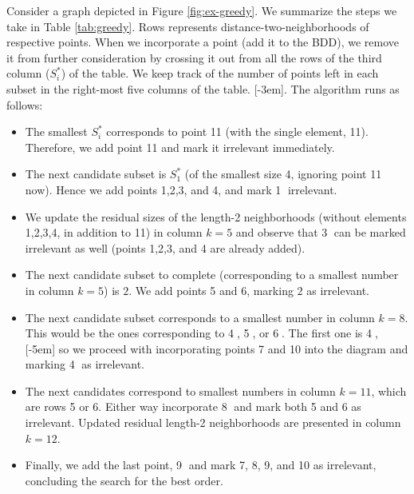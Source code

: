 \documentclass[11pt]{article}
\begin{document}
\begin{example}\label{ex:greedy}
Consider a graph depicted in Figure \ref{fig:ex-greedy}. We summarize the steps we
take in Table \ref{tab:greedy}. Rows represents distance-two-neighborhoods of
respective points. When we incorporate a point (add it to the BDD), we remove it
from further consideration by crossing it out from all the rows of the third
column (\(S^*_i\)) of the table. We keep track of the number of points left in
each subset in the right-most five columns of the table. [-3em]. The algorithm runs as follows:
\begin{itemize}
\item The smallest \(S^*_i\) corresponds to point 11 (with the single element, 11).
Therefore, we add point 11 and mark it irrelevant immediately.
\item The next candidate subset is \(S^*_1\) (of the smallest size 4, ignoring point
11 now). Hence we add points 1,2,3, and 4, and mark \textcircled{1} irrelevant.
\item We update the residual sizes of the length-2 neighborhoods (without elements
1,2,3,4, in addition to 11) in column \(k=5\) and observe that \textcircled{3}
can be marked irrelevant as well (points 1,2,3, and 4 are already added).
\item The next candidate subset to complete (corresponding to a smallest number in column
\(k=5\)) is \textcircled{$2$}. We add points 5 and 6, marking
\textcircled{$2$} as irrelevant.
\item The next candidate subset corresponds to a smallest number in column \(k=8\).
This would be the ones corresponding to \textcircled{4}, \textcircled{5}, or
\textcircled{6}. The first one is \textcircled{4}, [-5em] so we proceed with incorporating
points 7 and 10 into the diagram and marking \textcircled{4} as irrelevant.
\item The next candidates correspond to smallest numbers in column \(k=11\), which are
rows 5 or 6. Either way incorporate \textcircled{8} and mark both 5 and 6 as
irrelevant. Updated residual length-2 neighborhoods are presented in column
\(k=12\).
\item Finally, we add the last point, \textcircled{9} and mark 7, 8, 9, and 10 as
irrelevant, concluding the search for the best order.
\end{itemize}


\end{example}
\end{document}
